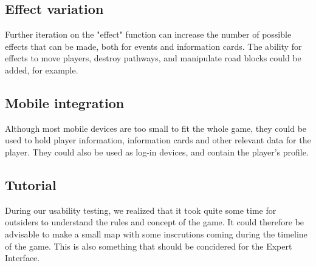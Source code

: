 \subsection{Effect variation}
Further iteration on the "effect" function can increase the number of possible effects that can be made, both for events and information cards. The ability for effects to move players, destroy pathways, and manipulate road blocks could be added, for example.\\

\subsection{Mobile integration}
Although most mobile devices are too small to fit the whole game, they could be used to hold player information, information cards and other relevant data for the player. They could also be used as log-in devices, and contain the player's profile.

\subsection{Tutorial} 
During our usability testing, we realized that it took quite some time for outsiders to understand the rules and concept of the game. It could therefore be advisable to make a small map with some inscrutions coming during the timeline of the game. This is also something that should be concidered for the Expert Interface. 

